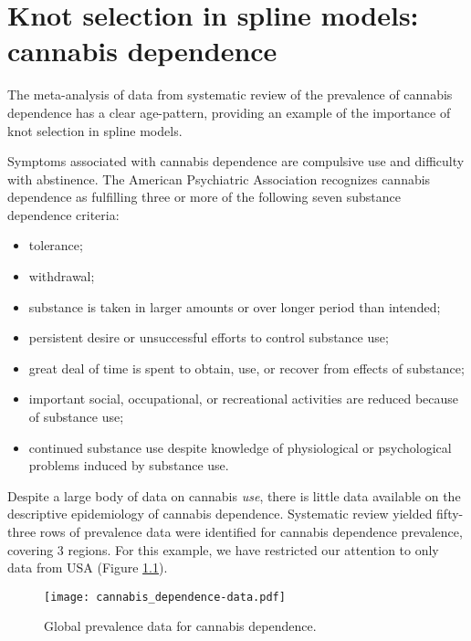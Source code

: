 \chapter{Knot selection in spline models: cannabis dependence}
\label{applications-splines_knot_loc}

The meta-analysis of data from systematic review of the prevalence of
cannabis dependence has a clear age-pattern, providing an example of
the importance of knot selection in spline models.

Symptoms associated with cannabis dependence are compulsive use and
difficulty with abstinence.  The American Psychiatric Association
recognizes cannabis dependence as fulfilling three or more of the
following seven substance dependence criteria: \cite{american_diagnostic_2000, coffey_cannabis_2002}
    \begin{itemize} \label{page:app-substance_dependence}
        \item tolerance;
        \item withdrawal;
        \item substance is taken in larger amounts or over longer
          period than intended;
        \item persistent desire or unsuccessful efforts to control
          substance use;
        \item great deal of time is spent to obtain, use, or recover
          from effects of substance;
        \item important social, occupational, or recreational
          activities are reduced because of substance use;
        \item continued substance use despite knowledge of
          physiological or psychological problems induced by substance
          use.
    \end{itemize}

Despite a large body of data on cannabis \emph{use}, there is little
data available on the descriptive epidemiology of cannabis
dependence.\cite{Degenhardt_GBDrugs_2011} Systematic review yielded
fifty-three rows of prevalence data were identified for cannabis
dependence prevalence, covering 3 regions.  For this example, we have
restricted our attention to only data from USA (Figure
\ref{fig:app-cannabis_data}).

    \begin{figure}[h]
        \begin{center}
            \texttt{[image: cannabis\_dependence-data.pdf]}
            \caption{Global prevalence data for cannabis dependence.}
            \label{fig:app-cannabis_data}
        \end{center}
    \end{figure}


